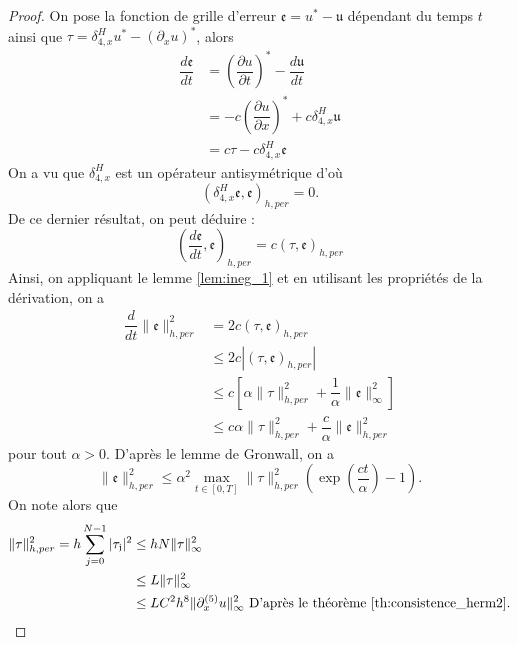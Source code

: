 \begin{proof}
On pose la fonction de grille d'erreur $\mathfrak{e} = u^* - \mathfrak{u}$ dépendant du temps $t$ ainsi que $\mathfrak{\tau} = \delta_{4,x}^H u^* - (\partial_x u)^*$, alors
\begin{align*}
\dfrac{d \mathfrak{e}}{dt} & = \left(\dfrac{\partial u}{\partial t}\right)^* - \dfrac{d \mathfrak{u}}{dt} \\
	& = - c \left( \dfrac{\partial u}{\partial x} \right)^* + c \delta_{4,x}^H \mathfrak{u} \\
	& = c \mathfrak{\tau} - c \delta_{4,x}^H \mathfrak{e}
\end{align*}
On a vu que $\delta_{4,x}^H$ est un opérateur antisymétrique d'où
\begin{equation}
( \delta_{4,x}^H \mathfrak{e}, \mathfrak{e} )_{h,per} = 0.
\end{equation}
De ce dernier résultat, on peut déduire :
\begin{equation}
( \dfrac{d \mathfrak{e}}{dt} , \mathfrak{e} )_{h,per} = c ( \mathfrak{\tau}, \mathfrak{e})_{h,per}
\end{equation}
Ainsi, on appliquant le lemme \ref{lem:ineg_1} et en utilisant les propriétés de la dérivation, on a
\begin{align*}
\dfrac{d}{dt} \|\mathfrak{e}\|_{h,per}^2 & = 2 c ( \mathfrak{\tau}, \mathfrak{e})_{h,per} \\
   & \leq 2 c |( \mathfrak{\tau}, \mathfrak{e})_{h,per}| \\
   & \leq c \left[ \alpha \|\mathfrak{\tau}\|_{h,per}^2 + \dfrac{1}{\alpha} \|\mathfrak{e}\|_{\infty}^2 \right] \\
   & \leq c \alpha \|\mathfrak{\tau}\|^2_{h,per} + \dfrac{c}{\alpha} \|\mathfrak{e}\|^2_{h,per} 
\end{align*}
pour tout $\alpha > 0$.
D'après le lemme de Gronwall, on a
\begin{equation}
\|\mathfrak{e}\|_{h,per}^2 \leq \alpha^2 \max_{t \in [0,T]} \|\mathfrak{\tau}\|_{h,per}^2   \left( \exp \left( \dfrac{ct}{\alpha} \right) -1  \right).
\end{equation}
On note alors que
\begin{align*}
\|\mathfrak{\tau}\|_{h,per}^2 = h \gsum_{j=0}^{N-1} |\mathfrak{\tau_j}|^2 & \leq h N \|\mathfrak{\tau}\|_{\infty}^2 \\
	& \leq  L \|\mathfrak{\tau}\|_{\infty}^2 \\
	& \leq L C^2 h^8  \| \partial_x^{(5)} u \|_{\infty}^2 \text{ D'après le théorème \ref{th:consistence_herm2}.}

\end{align*}
\end{proof}
